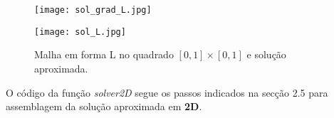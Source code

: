 \documentclass{article}
\theoremstyle{definition}
\theoremstyle{plain}
\numberwithin{equation}{section}
\newcommand{\tab}{\hspace{10mm}}
\begin{document}
\vspace{15mm}

\begin{figure} [H]
\centering
\begin{minipage}{0.5\textwidth}
  \centering
  \texttt{[image: sol\_grad\_L.jpg]}
\end{minipage}%
\begin{minipage}{0.5\textwidth}
  \centering
  \texttt{[image: sol\_L.jpg]}
\end{minipage}
\caption{ Malha em forma L no quadrado $[0, 1] \times [0, 1]$ e solução aproximada.}
\end{figure}


\vspace{10mm}

\tab O código da função \emph{solver2D} segue os passos indicados na secção 2.5 para assemblagem da solução aproximada em \textbf{2D}.
\end{document}
